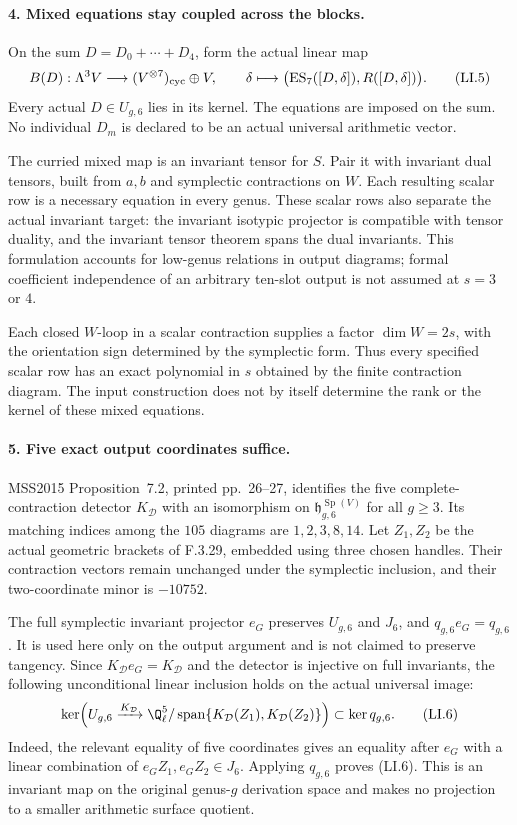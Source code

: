 \paragraph{4. Mixed equations stay coupled across the blocks.}
On the sum $D=D_0+\cdots+D_4$, form the actual linear map
\[
 B(D):\Lambda^3V\longrightarrow
       (V^{\otimes7})_{\rm cyc}\oplus V,\qquad
 \delta\longmapsto
   \bigl(\operatorname{ES}_7([D,\delta]),R([D,\delta])\bigr).
                                                               \tag{LI.5}
\]
Every actual $D\in U_{g,6}$ lies in its kernel. The equations
are imposed on the sum. No individual $D_m$ is declared
to be an actual universal arithmetic vector.

The curried mixed map is an invariant tensor for $S$.
Pair it with invariant dual tensors, built from $a,b$
and symplectic contractions on $W$. Each resulting scalar
row is a necessary equation in every genus. These scalar
rows also separate the actual invariant target: the
invariant isotypic projector is compatible with tensor
duality, and the invariant tensor theorem spans the dual
invariants. This formulation accounts for low-genus
relations in output diagrams; formal coefficient
independence of an arbitrary ten-slot output is not
assumed at $s=3$ or $4$.

Each closed $W$-loop in a scalar contraction supplies a
factor $\dim W=2s$, with the orientation sign determined
by the symplectic form. Thus every specified scalar
row has an exact polynomial in $s$ obtained by the
finite contraction diagram. The input construction
does not by itself determine the rank or the kernel
of these mixed equations.

\paragraph{5. Five exact output coordinates suffice.}
MSS2015 Proposition~7.2, printed pp.~26--27, identifies
the five complete-contraction detector $K_{\mathcal D}$
with an isomorphism on
$\mathfrak h_{g,6}^{\operatorname{Sp}(V)}$ for all $g\geq3$.
Its matching indices among the $105$ diagrams are
$1,2,3,8,14$. Let $Z_1,Z_2$ be the actual geometric
brackets of F.3.29, embedded using three chosen handles.
Their contraction vectors remain unchanged under the
symplectic inclusion, and their two-coordinate minor
is $-10752$.

The full symplectic invariant projector $e_G$ preserves
$U_{g,6}$ and $J_6$, and $q_{g,6}e_G=q_{g,6}$.
It is used here only on the output argument and is not
claimed to preserve tangency. Since $K_{\mathcal D}e_G
=K_{\mathcal D}$ and the detector is injective on full
invariants, the following unconditional linear inclusion
holds on the actual universal image:
\[
 \ker\!\left(U_{g,6}\xrightarrow{K_{\mathcal D}}
  \Q_\ell^5/\operatorname{span}\{K_{\mathcal D}(Z_1),
                                      K_{\mathcal D}(Z_2)\}\right)
                 \subset\ker q_{g,6}.                    \tag{LI.6}
\]
Indeed, the relevant equality of five coordinates gives
an equality after $e_G$ with a linear combination of
$e_GZ_1,e_GZ_2\in J_6$. Applying $q_{g,6}$ proves (LI.6).
This is an invariant map on the original genus-$g$
derivation space and makes no projection to a smaller
arithmetic surface quotient.


